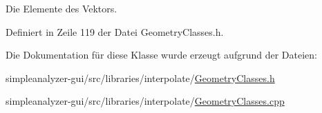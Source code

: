 Die Elemente des Vektors. 



Definiert in Zeile 119 der Datei Geometry\-Classes.\-h.



Die Dokumentation für diese Klasse wurde erzeugt aufgrund der Dateien\-:\begin{DoxyCompactItemize}
\item 
simpleanalyzer-\/gui/src/libraries/interpolate/\hyperlink{GeometryClasses_8h}{Geometry\-Classes.\-h}\item 
simpleanalyzer-\/gui/src/libraries/interpolate/\hyperlink{GeometryClasses_8cpp}{Geometry\-Classes.\-cpp}\end{DoxyCompactItemize}
